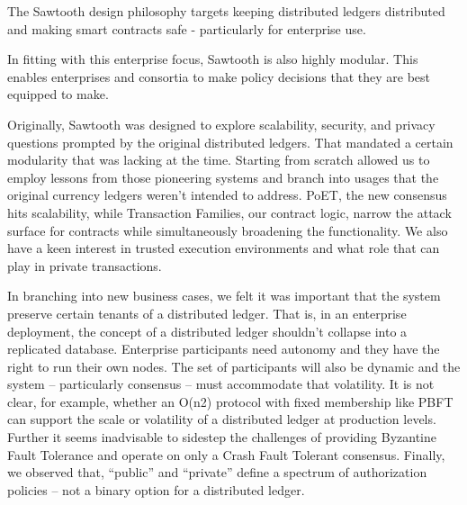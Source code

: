 The Sawtooth design philosophy targets keeping distributed ledgers distributed and making smart contracts safe - particularly for enterprise use.

In fitting with this enterprise focus, Sawtooth is also highly modular. This enables enterprises and consortia to make policy decisions that they are best equipped to make.

Originally, Sawtooth was designed to explore scalability, security, and privacy questions prompted by the original distributed ledgers. That mandated a certain modularity that was lacking at the time. Starting from scratch allowed us to employ lessons from those pioneering systems and branch into usages that the original currency ledgers weren't intended to address. PoET, the new consensus hits scalability, while Transaction Families, our contract logic, narrow the attack surface for contracts while simultaneously broadening the functionality. We also have a keen interest in trusted execution environments and what role that can play in private transactions.

In branching into new business cases, we felt it was important that the system preserve certain tenants of a distributed ledger. That is, in an enterprise deployment, the concept of a distributed ledger shouldn't collapse into a replicated database. Enterprise participants need autonomy and they have the right to run their own nodes. The set of participants will also be dynamic and the system – particularly consensus – must accommodate that volatility. It is not clear, for example, whether an O(n2) protocol with fixed membership like PBFT can support the scale or volatility of a distributed ledger at production levels. Further it seems inadvisable to sidestep the challenges of providing Byzantine Fault Tolerance and operate on only a Crash Fault Tolerant consensus. Finally, we observed that, “public” and “private” define a spectrum of authorization policies – not a binary option for a distributed ledger.

